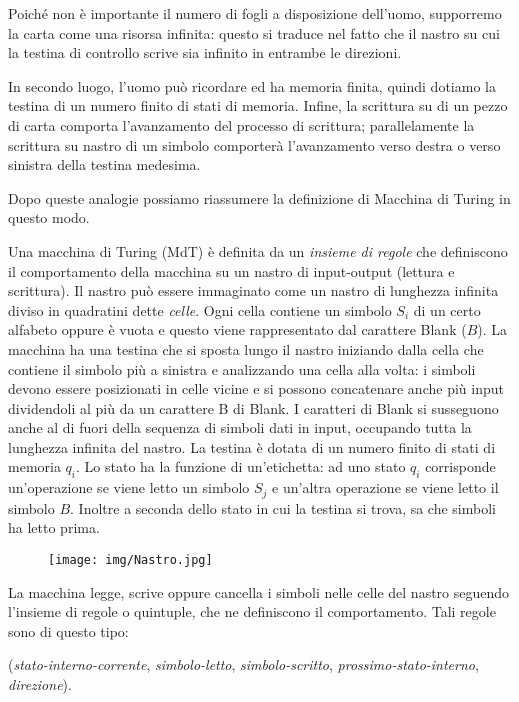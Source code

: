 Poich\'e non \`e importante il numero di fogli a disposizione dell'uomo,
supporremo la carta come una risorsa infinita: questo si traduce nel fatto che
il nastro su cui la testina di controllo scrive sia infinito in entrambe le
direzioni.

In secondo luogo, l'uomo pu\`o ricordare ed ha memoria finita, quindi dotiamo la
testina di un numero finito di stati di memoria. Infine, la scrittura su di un
pezzo di carta comporta l'avanzamento del processo di scrittura; parallelamente
la scrittura su nastro di un simbolo comporter\`a l'avanzamento verso destra o
verso sinistra della testina medesima.

Dopo queste analogie possiamo riassumere la definizione di Macchina di Turing in
questo modo.

Una macchina di Turing (MdT) \`e definita da un \textsl{insieme di
  regole} che definiscono il comportamento della macchina su un nastro
di input-output (lettura e scrittura). Il nastro pu\`o essere
immaginato come un nastro di lunghezza infinita diviso in quadratini
dette \textsl{celle}. Ogni cella contiene un simbolo $S_i$ di un certo
alfabeto oppure \`e vuota e questo viene rappresentato dal carattere
Blank ($B$). La macchina ha una testina che si sposta lungo il nastro
iniziando dalla cella che contiene il simbolo pi\`u a sinistra e
analizzando una cella alla volta: i simboli devono essere posizionati
in celle vicine e si possono concatenare anche pi\`u input dividendoli
al pi\`u da un carattere B di Blank. I caratteri di Blank si
susseguono anche al di fuori della sequenza di simboli dati in input,
occupando tutta la lunghezza infinita del nastro.  La testina \`e
dotata di un numero finito di stati di memoria $q_i$. Lo stato ha la
funzione di un'etichetta: ad uno stato $q_i$ corrisponde un'operazione
se viene letto un simbolo $S_j$ e un'altra operazione se viene letto
il simbolo $B$. Inoltre a seconda dello stato in cui la testina si
trova, sa che simboli ha letto prima.

\begin{figure}[htbp!]
\centering
\texttt{[image: img/Nastro.jpg]}
\end{figure}

La macchina legge, scrive oppure cancella i simboli nelle celle del nastro
seguendo l'insieme di regole o quintuple,  che ne definiscono il comportamento.
Tali regole sono di questo tipo:

\vspace{0.3cm}
(\textsl{stato-interno-corrente}, \textsl{simbolo-letto},
\textsl{simbolo-scritto}, \textsl{prossimo-stato-interno}, \textsl{direzione}).
\vspace{0.3cm}

